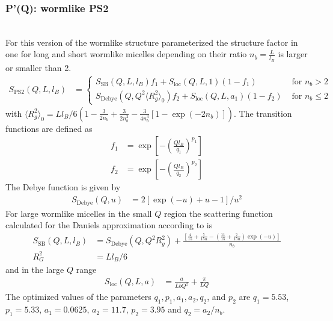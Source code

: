 \subsubsection{P'(Q): wormlike PS2} ~\\
\label{plugin:Pprime4wormPS2}
For this version of the wormlike structure \cite{Pedersen96Macrom} parameterized the structure factor in one for long and short wormlike micelles depending on their ratio $n_b=\frac{L}{l_B}$ is larger or smaller than 2.
\begin{align}
S_\mathrm{PS2}(Q,L,l_B) &=
\begin{cases}
    S_\mathrm{SB}(Q,L,l_B) f_1 + S_\mathrm{loc}(Q,L,1) (1-f_1) & \mbox{ for~}  n_b > 2 \\
    S_\mathrm{Debye}(Q,Q^2\langle R_g^2\rangle_0) f_2 + S_\mathrm{loc}(Q,L,a_1) (1-f_2) & \mbox{ for~}  n_b \leq 2
\end{cases}
\end{align}
with $\langle R_g^2\rangle_0 = Ll_B/6\left(1-\frac{3}{2 n_b}
            +\frac{3}{2 n_b^2}
			-\frac{3}{4 n_b^3}
			\left[1-\exp(-2 n_b)\right]\right)$.
The transition functions are defined as
\begin{align}
f_1 &= \exp\left[-\left(\frac{Ql_B}{q_1}\right)^{p_1}\right] \\
f_2 &= \exp\left[-\left(\frac{Ql_B}{q_2}\right)^{p_2}\right]
\end{align}
The Debye function is given by
\begin{align}
S_\mathrm{Debye}(Q,u) &= 2\left[\exp(-u)+u-1\right]/u^2
\end{align}
For large wormlike micelles in the small $Q$ region the scattering function calculated for the
Daniels approximation \cite{Daniels1952} according to \cite{Sharp1968,Pedersen96Macrom} is
\begin{align}
S_\mathrm{SB}(Q,L,l_B) &= S_\mathrm{Debye}(Q,Q^2 R_g^2)+
    \frac{\left[\frac{4}{15} +\frac{7}{15u}-\left(\frac{11}{15}+\frac{7}{15u}\right)\exp(-u)\right]}{n_b}\\
R_G^2 &=Ll_B/6
\end{align}
and in the large $Q$ range
\begin{align}
S_\mathrm{loc}(Q,L,a) &= \frac{a}{LbQ^2} + \frac{\pi}{LQ}
\end{align}
The optimized values of the parameters $q_1,p_1, a_1, a_2, q_2$, and $ p_2$ are
$q_1 = 5.53$, $p_1 = 5.33$, $a_1 = 0.0625$, $a_2 = 11.7$, $p_2 = 3.95$ and
$q_2 = a_2/n_b$.

\vspace{5mm}

